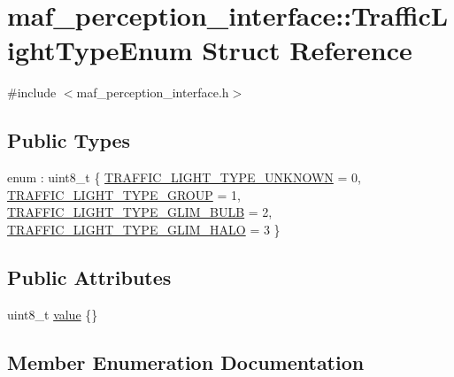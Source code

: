 \hypertarget{structmaf__perception__interface_1_1TrafficLightTypeEnum}{}\section{maf\+\_\+perception\+\_\+interface\+:\+:Traffic\+Light\+Type\+Enum Struct Reference}
\label{structmaf__perception__interface_1_1TrafficLightTypeEnum}


{\ttfamily \#include $<$maf\+\_\+perception\+\_\+interface.\+h$>$}

\subsection*{Public Types}
\begin{DoxyCompactItemize}
\item 
enum \+: uint8\+\_\+t \{ \hyperlink{structmaf__perception__interface_1_1TrafficLightTypeEnum_a2c005d2e3372a9a36bab455f953167a7a8e065c7d53247e29fff80a56b2a0c843}{T\+R\+A\+F\+F\+I\+C\+\_\+\+L\+I\+G\+H\+T\+\_\+\+T\+Y\+P\+E\+\_\+\+U\+N\+K\+N\+O\+WN} = 0, 
\hyperlink{structmaf__perception__interface_1_1TrafficLightTypeEnum_a2c005d2e3372a9a36bab455f953167a7a3b67a41748334a39b9e04421a1c6b5fd}{T\+R\+A\+F\+F\+I\+C\+\_\+\+L\+I\+G\+H\+T\+\_\+\+T\+Y\+P\+E\+\_\+\+G\+R\+O\+UP} = 1, 
\hyperlink{structmaf__perception__interface_1_1TrafficLightTypeEnum_a2c005d2e3372a9a36bab455f953167a7a10219e4f57a6c06f62c7f25caadbd9c8}{T\+R\+A\+F\+F\+I\+C\+\_\+\+L\+I\+G\+H\+T\+\_\+\+T\+Y\+P\+E\+\_\+\+G\+L\+I\+M\+\_\+\+B\+U\+LB} = 2, 
\hyperlink{structmaf__perception__interface_1_1TrafficLightTypeEnum_a2c005d2e3372a9a36bab455f953167a7a715d294c6f86daf2e035f4f39621c0be}{T\+R\+A\+F\+F\+I\+C\+\_\+\+L\+I\+G\+H\+T\+\_\+\+T\+Y\+P\+E\+\_\+\+G\+L\+I\+M\+\_\+\+H\+A\+LO} = 3
 \}
\end{DoxyCompactItemize}
\subsection*{Public Attributes}
\begin{DoxyCompactItemize}
\item 
uint8\+\_\+t \hyperlink{structmaf__perception__interface_1_1TrafficLightTypeEnum_ad7637c8c306029dedd091f43740745fc}{value} \{\}
\end{DoxyCompactItemize}


\subsection{Member Enumeration Documentation}
\mbox{\label{structmaf__perception__interface_1_1TrafficLightTypeEnum_a2c005d2e3372a9a36bab455f953167a7}} 
